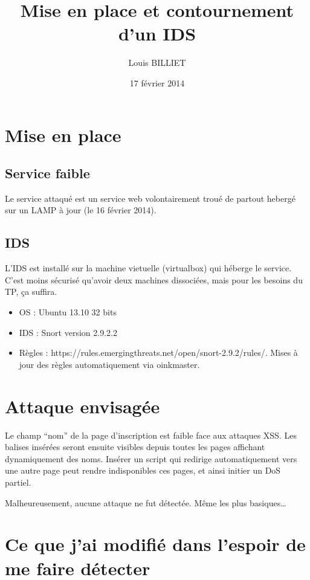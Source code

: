 \documentclass[oneside,10pt]{article}
\begin{document}
\title{Mise en place et contournement d'un IDS}
\author{Louis BILLIET}
\date{17 f\'evrier 2014}
\maketitle

\section{Mise en place}
\subsection{Service faible}
Le service attaqu\'e est un service web volontairement trou\'e de partout heberg\'e sur un LAMP \`a jour (le 16 f\'evrier 2014).

\subsection{IDS}
L'IDS est install\'e sur la machine vietuelle (virtualbox) qui h\'eberge le service.
C'est moins s\'ecuris\'e qu'avoir deux machines dissoci\'ees, mais pour les besoins du TP, \c ca suffira.
\begin{itemize}
\item OS : Ubuntu 13.10 32 bits
\item IDS : Snort version 2.9.2.2
\item R\`egles : https://rules.emergingthreats.net/open/snort-2.9.2/rules/.
Mises \`a jour des r\`egles automatiquement via oinkmaster.
\end{itemize}

\section{Attaque envisag\'ee}
Le champ ``nom'' de la page d'inscription est faible face aux attaques XSS.
Les balises ins\'er\'ees seront ensuite visibles depuis toutes les pages affichant dynamiquement des noms.
Ins\'erer un script qui redirige automatiquement vers une autre page peut rendre indisponibles ces pages, et ainsi initier un DoS partiel.


Malheureusement, aucune attaque ne fut d\'etect\'ee.
M\^eme les plus basiques\ldots

\section{Ce que j'ai modifi\'e dans l'espoir de me faire d\'etecter}
\end{document}
